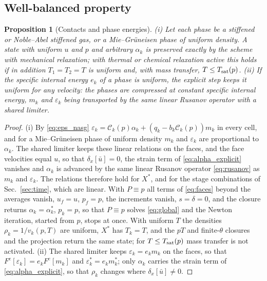 \documentclass[a4paper,fleqn]{cas-sc}
\newtheorem{proposition}[theorem]{Proposition}
\begin{document}
\subsection{Well-balanced property}
\label{sec:wb}
\begin{proposition}[Contacts and phase energies]\label{prop:wb}
(i) Let each phase be a stiffened or Noble--Abel stiffened gas, or a Mie--Gr\"uneisen phase of uniform density. A state
with uniform $u$ and $p$ and arbitrary $\alpha_k$ is preserved exactly by the scheme with mechanical relaxation; with thermal
or chemical relaxation active this holds if in addition $T_1=T_2=T$ is uniform and, with mass transfer, $T\le T_{\rm sat}(p)$.
(ii) If the specific internal energy $e_k$ of a phase is uniform, the explicit step keeps it uniform for any velocity: the
phases are compressed at constant specific internal energy, $m_k$ and $\varepsilon_k$ being transported by the same linear Rusanov operator with a shared limiter.
\end{proposition}
\begin{proof}
(i) By \eqref{eq:eps_nasg} $\varepsilon_k=\mathcal C_k(p)\alpha_k+(q_k-b_k\mathcal C_k(p))m_k$ in every cell, and for a Mie--Gr\"uneisen phase of
uniform density $m_k$ and $\varepsilon_k$ are proportional to $\alpha_k$. The shared limiter keeps these linear relations
on the faces, and the face velocities equal $u$, so that $\delta_x[\bar u]=0$, the strain term of \eqref{eq:alpha_explicit} vanishes and $\alpha_k$
is advanced by the same linear Rusanov operator \eqref{eq:rusanov} as $m_k$ and $\varepsilon_k$. The relations therefore hold for $X^*$,
and for the stage combinations of Sec.~\ref{sec:time}, which are linear. With $P\equiv p$ all terms of \eqref{eq:faces} beyond the averages
vanish, $u_f=u$, $p_f=p$, the increments vanish, $s=\delta=0$, and the closure returns $\alpha_k=\alpha^*_k$, $p_k=p$, so that $P\equiv p$ solves
\eqref{eq:global} and the Newton iteration, started from $p$, stops at once. With uniform $T$ the densities $\rho_k=1/v_k(p,T)$
are uniform, $X^*$ has $T_k=T$, and the $pT$ and finite-$\theta$ closures and the projection return the same state; for
$T\le T_{\rm sat}(p)$ mass transfer is not activated. (ii) The shared limiter keeps $\varepsilon_k=e_km_k$ on the faces, so that
$F^e[\varepsilon_k]=e_kF^e[m_k]$ and $\varepsilon^*_k=e_km^*_k$; only $\alpha_k$ carries the strain term of \eqref{eq:alpha_explicit}, so that $\rho_k$
changes where $\delta_x[\bar u]\ne0$.
\end{proof}
\end{document}
